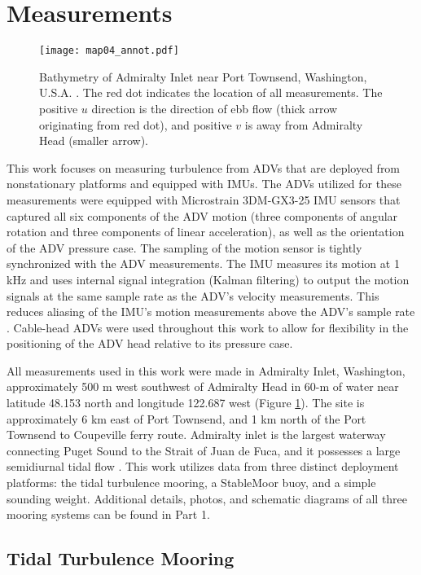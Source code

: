
\section{Measurements}
\label{sec:meas}

\begin{figure}[t]
  \centering
  \texttt{[image: map04\_annot.pdf]}
  \caption{Bathymetry of Admiralty Inlet near Port Townsend, Washington, U.S.A. \cite[]{Finlayson2005}. The red dot indicates the location of all measurements. The positive $u$ direction is the direction of ebb flow (thick arrow originating from red dot), and positive $v$ is away from Admiralty Head (smaller arrow).}
  \label{fig:map}
\end{figure}

This work focuses on measuring turbulence from ADVs that are deployed from nonstationary platforms and equipped with IMUs. The ADVs utilized for these measurements were equipped with Microstrain 3DM-GX3-25 IMU sensors that captured all six components of the ADV motion (three components of angular rotation and three components of linear acceleration), as well as the orientation of the ADV pressure case. The sampling of the motion sensor is tightly synchronized with the ADV measurements. The IMU measures its motion at 1 kHz and uses internal signal integration (Kalman filtering) to output the motion signals at the same sample rate as the ADV's velocity measurements. This reduces aliasing of the IMU's motion measurements above the ADV's sample rate \cite[]{3DM-GX3_coning_sculling}. Cable-head ADVs were used throughout this work to allow for flexibility in the positioning of the ADV head relative to its pressure case.

All measurements used in this work were made in Admiralty Inlet, Washington, approximately 500 m west southwest of Admiralty Head in 60-m of water near latitude 48.153 north and longitude 122.687 west (Figure \ref{fig:map}). The site is approximately 6 km east of Port Townsend, and 1 km north of the Port Townsend to Coupeville ferry route.  Admiralty inlet is the largest waterway connecting Puget Sound to the Strait of Juan de Fuca, and it possesses a large semidiurnal tidal flow \cite[]{Thomson++2012, Polagye+Thomson2013}.  This work utilizes data from three distinct deployment platforms: the tidal turbulence mooring, a StableMoor buoy, and a simple sounding weight.  Additional details, photos, and schematic diagrams of all three mooring systems can be found in Part 1.

\subsection{Tidal Turbulence Mooring}

